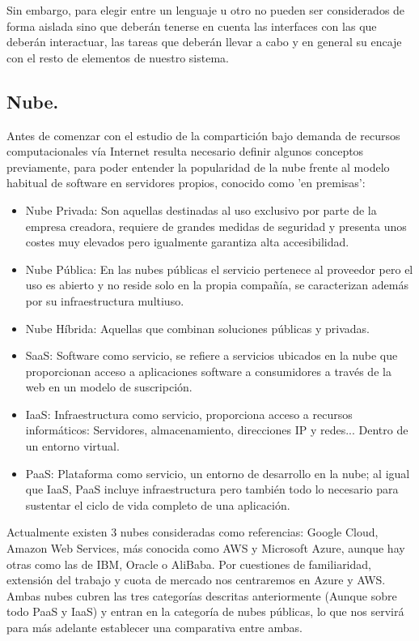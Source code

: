 \documentclass[11pt, a4paper]{article} %
\begin{document}
Sin embargo, para elegir entre un lenguaje u otro no pueden ser considerados de forma aislada sino que deberán tenerse en cuenta las interfaces con las que deberán interactuar, las tareas que deberán llevar a cabo y en general su encaje con el resto de elementos de nuestro sistema.
\subsection{Nube.}
Antes de comenzar con el estudio de la compartición bajo demanda de recursos computacionales vía Internet resulta necesario definir algunos conceptos previamente, para poder entender la popularidad de la nube frente al modelo habitual de software en servidores propios, conocido como 'en premisas': 
\begin{itemize}
\item Nube Privada: Son aquellas destinadas al uso exclusivo por parte de la empresa creadora, requiere de grandes medidas de seguridad y presenta unos costes muy elevados pero igualmente garantiza alta accesibilidad.
\item Nube Pública: En las nubes públicas el servicio pertenece al proveedor pero el uso es abierto y no reside solo en la propia compañía, se caracterizan además por su infraestructura multiuso.
\item Nube Híbrida: Aquellas que combinan soluciones públicas y privadas.
\item SaaS: Software como servicio, se refiere a servicios ubicados en la nube que proporcionan acceso a aplicaciones software a consumidores a través de la web en un modelo de suscripción.
\item IaaS: Infraestructura como servicio, proporciona acceso a recursos informáticos: Servidores, almacenamiento, direcciones IP y redes... Dentro de un entorno virtual.
\item PaaS: Plataforma como servicio, un entorno de desarrollo en la nube; al igual que IaaS, PaaS incluye infraestructura pero también todo lo necesario para sustentar el ciclo de vida completo de una aplicación.
\end{itemize}


Actualmente existen 3 nubes consideradas como referencias: Google Cloud, Amazon Web Services, más conocida como AWS y Microsoft Azure, aunque hay otras como las de IBM, Oracle o AliBaba. Por cuestiones de familiaridad, extensión del trabajo y cuota de mercado nos centraremos en Azure y AWS. Ambas nubes cubren las tres categorías descritas anteriormente (Aunque sobre todo PaaS y IaaS) y entran en la categoría de nubes públicas, lo que nos servirá para más adelante establecer una comparativa entre ambas.
\end{document}
